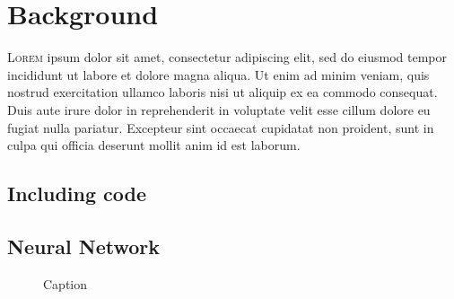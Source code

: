 

\chapter{Background}



\lettrine{L}{orem} ipsum dolor sit amet, consectetur adipiscing elit, sed do
eiusmod tempor incididunt ut labore et dolore magna aliqua. Ut enim ad minim
veniam, quis nostrud exercitation ullamco laboris nisi ut aliquip ex ea commodo
consequat. Duis aute irure dolor in reprehenderit in voluptate velit esse cillum
dolore eu fugiat nulla pariatur. Excepteur sint occaecat cupidatat non proident,
sunt in culpa qui officia deserunt mollit anim id est laborum.


\section{Including code}



\section{Neural Network}

\begin{figure}[htbp]
  \centering
  
  \caption{Caption}
  \label{fig:label}
\end{figure}
